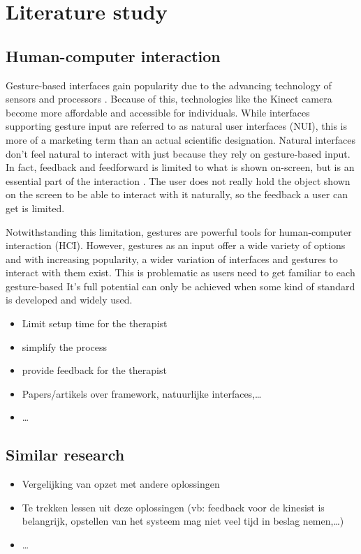 \chapter{Literature study}

\section{Human-computer interaction}

Gesture-based interfaces gain popularity due to the advancing technology of sensors and processors \citep*{Jacob2008}. Because of this, technologies like the Kinect camera become more affordable and accessible for individuals. While interfaces supporting gesture input are referred to as natural user interfaces (NUI), this is more of a marketing term than an actual scientific designation. Natural interfaces don't feel natural to interact with just because they rely on gesture-based input. In fact, feedback and feedforward is limited to what is shown on-screen, but is an essential part of the interaction \citep*{Wensveen2004}. The user does not really hold the object shown on the screen to be able to interact with it naturally, so the feedback a user can get is limited. \citep*{Norman2010}

Notwithstanding this limitation, gestures are powerful tools for human-computer interaction (HCI). However, gestures as an input offer a wide variety of options and with increasing popularity, a wider variation of interfaces and gestures to interact with them exist. This is problematic as users need to get familiar to each gesture-based It's full potential can only be achieved when some kind of standard is developed and widely used. 

\begin{itemize}

\item Limit setup time for the therapist
\item simplify the process
\item provide feedback for the therapist
\item Papers/artikels over framework, natuurlijke interfaces,\ldots
\item \ldots
\end{itemize}


\section{Similar research}

\begin{itemize}
\item Vergelijking van opzet met andere oplossingen 
\item Te trekken lessen uit deze oplossingen (vb: feedback voor de kinesist is belangrijk, opstellen van het systeem mag niet veel tijd in beslag nemen,\ldots)
\item \ldots
\end{itemize}
